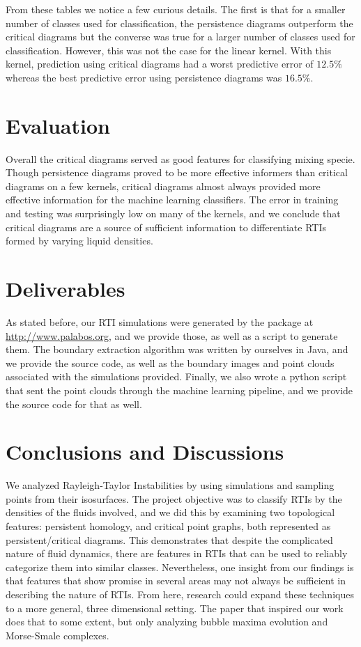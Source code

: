 \documentclass[12pt, fullpage,letterpaper]{article}
\theoremstyle{definition}
\begin{document}
	From these tables we notice a few curious details. The first is that for a smaller number of classes used for classification, the persistence diagrams outperform the critical diagrams but the converse was true for a larger number of classes used for classification. However, this was not the case for the linear kernel. With this kernel, prediction using critical diagrams had a worst predictive error of $12.5\%$ whereas the best predictive error using persistence diagrams was $16.5\%$. 

\section*{\normalfont Evaluation}
Overall the critical diagrams served as good features for classifying mixing specie. Though persistence diagrams proved to be more effective informers than critical diagrams on a few kernels, critical diagrams almost always provided more effective information for the machine learning classifiers. The error in training and testing was surprisingly low on many of the kernels, and we conclude that critical diagrams are a source of sufficient information to differentiate RTIs formed by varying liquid densities.

\section*{\normalfont Deliverables} As stated before, our RTI simulations were generated by the package at \url{http://www.palabos.org}, and we provide those, as well as a script to generate them. The boundary extraction algorithm was written by ourselves in Java, and we provide the source code, as well as the boundary images and point clouds associated with the simulations provided. Finally, we also wrote a python script that sent the point clouds through the machine learning pipeline, and we provide the source code for that as well.

\section*{\normalfont Conclusions and Discussions}
	We analyzed Rayleigh-Taylor Instabilities by using simulations and sampling points from their isosurfaces. The project objective was to classify RTIs by the densities of the fluids involved, and we did this by examining two topological features: persistent homology, and critical point graphs, both represented as persistent/critical diagrams. This demonstrates that despite the complicated nature of fluid dynamics, there are features in RTIs that can be used to reliably categorize them into similar classes. Nevertheless, one insight from our findings is that features that show promise in several areas may not always be sufficient in describing the nature of RTIs. From here, research could expand these techniques to a more general, three dimensional setting. The paper that inspired our work does that to some extent, but only analyzing bubble maxima evolution and Morse-Smale complexes.
{}

\end{document}
